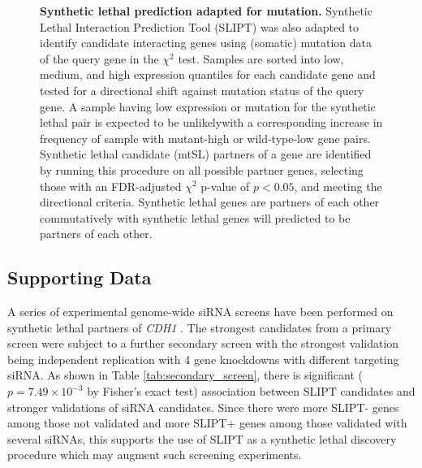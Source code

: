 \begin{figure}[!ht]
  \begin{center}
  \resizebox{0.8 \textwidth}{!}{
    
   }
   \end{center}
   \caption[Synthetic lethal prediction adapted for mutation]{\textbf{Synthetic lethal prediction adapted for mutation.} Synthetic Lethal Interaction Prediction Tool (SLIPT) was also adapted to identify candidate interacting genes using (somatic) mutation data of the query gene in the $\chi^2$ test. Samples are sorted into low, medium, and high expression quantiles for each candidate gene and tested for a directional shift against mutation status of the query gene. A sample having low expression or mutation for the synthetic lethal pair is expected to be unlikelywith a corresponding increase in frequency of sample with mutant-high or wild-type-low gene pairs. Synthetic lethal candidate (mtSL) partners of a gene are identified by running this procedure on all possible partner genes, selecting those with an FDR-adjusted $\chi^2$ p-value of $p < 0.05$, and meeting the directional criteria. Synthetic lethal genes are partners of each other commutatively with synthetic lethal genes will predicted to be partners of each other.
}
\label{fig:SLIPT_Method_mtSL}
\end{figure}

\subsection{Supporting Data}

A series of experimental genome-wide siRNA screens have been performed on synthetic lethal partners of \textit{CDH1} \citep{Telford2015}. The strongest candidates from a primary screen were subject to a further secondary screen with the strongest validation being independent replication with 4 gene knockdowns with different targeting siRNA. As shown in Table \ref{tab:secondary_screen}, there is significant ($p=7.49 \times 10^{-3}$ by Fisher's exact test) %
association between SLIPT candidates and stronger validations of siRNA candidates. Since there were more SLIPT- genes among those not validated and more SLIPT+ genes among those validated with several siRNAs, this supports the use of SLIPT as a synthetic lethal discovery procedure which may augment such screening experiments.

